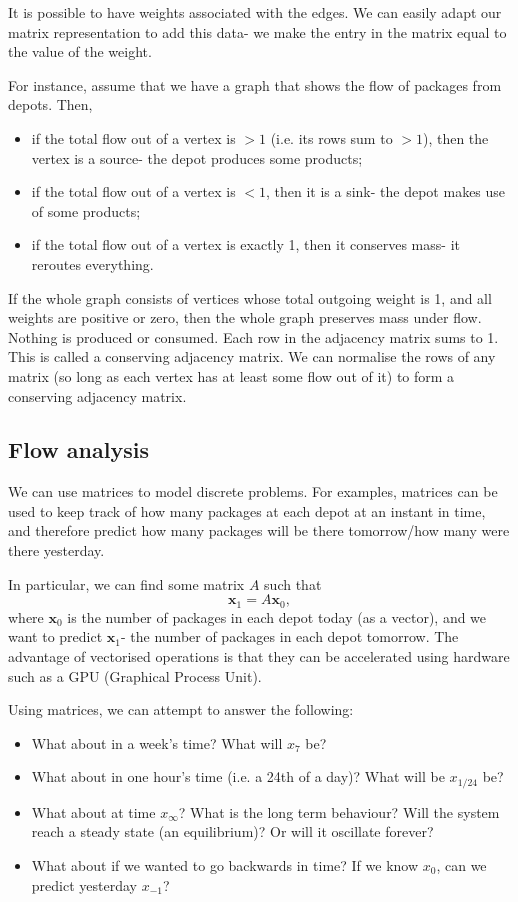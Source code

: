 \documentclass[a4paper, openany]{memoir}
\begin{document}
    It is possible to have weights associated with the edges. We can easily adapt our matrix representation to add this data- we make the entry in the matrix equal to the value of the weight.

    For instance, assume that we have a graph that shows the flow of packages from depots. Then,
    \begin{itemize}
        \item if the total flow out of a vertex is $> 1$ (i.e. its rows sum to $> 1$), then the vertex is a source- the depot produces some products;
        \item if the total flow out of a vertex is $< 1$, then it is a sink- the depot makes use of some products;
        \item if the total flow out of a vertex is exactly 1, then it conserves mass- it reroutes everything.
    \end{itemize}
    If the whole graph consists of vertices whose total outgoing weight is 1, and all weights are positive or zero, then the whole graph preserves mass under flow. Nothing is produced or consumed. Each row in the adjacency matrix sums to 1. This is called a conserving adjacency matrix. We can normalise the rows of any matrix (so long as each vertex has at least some flow out of it) to form a conserving adjacency matrix.

    \subsection{Flow analysis}
    We can use matrices to model discrete problems. For examples, matrices can be used to keep track of how many packages at each depot at an instant in time, and therefore predict how many packages will be there tomorrow/how many were there yesterday.

    In particular, we can find some matrix $A$ such that
    \[\mathbf{x}_1 = A \mathbf{x}_0,\]
    where $\mathbf{x}_0$ is the number of packages in each depot today (as a vector), and we want to predict $\mathbf{x}_1$- the number of packages in each depot tomorrow. The advantage of vectorised operations is that they can be accelerated using hardware such as a GPU (Graphical Process Unit).

    Using matrices, we can attempt to answer the following:
    \begin{itemize}
        \item What about in a week's time? What will $x_7$ be?
        \item What about in one hour's time (i.e. a 24th of a day)? What will be $x_{1/24}$ be?
        \item What about at time $x_{\infty}$? What is the long term behaviour? Will the system reach a steady state (an equilibrium)? Or will it oscillate forever?
        \item What about if we wanted to go backwards in time? If we know $x_0$, can we predict yesterday $x_{-1}$?
    \end{itemize}
\end{document}
